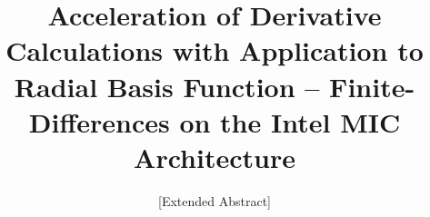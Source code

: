 \documentclass{sig-alternate}
\newcommand{\todo}[1]{{\color{red}\textbf{\hl{#1}}\xspace}}
\begin{document}
\title{Acceleration of Derivative Calculations with Application to Radial Basis Function --
Finite-Differences on the Intel MIC Architecture}

\subtitle{[Extended Abstract]}


\maketitle


\end{document}

